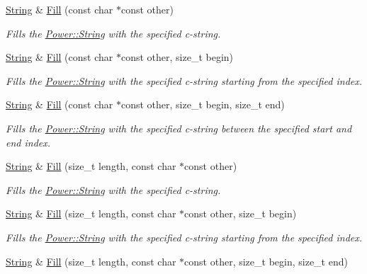 \begin{DoxyCompactItemize}
\hyperlink{class_power_1_1_string}{String} \& \hyperlink{class_power_1_1_string_a8adb368321b42b3399836b4f1b6410e2}{Fill} (const char $\ast$const other)
\begin{DoxyCompactList}\small\item\em Fills the \hyperlink{class_power_1_1_string}{Power\+::\+String} with the specified c-\/string. \end{DoxyCompactList}\item 
\hyperlink{class_power_1_1_string}{String} \& \hyperlink{class_power_1_1_string_a8bbc67bacb2a655a92bd259a5541117d}{Fill} (const char $\ast$const other, size\+\_\+t begin)
\begin{DoxyCompactList}\small\item\em Fills the \hyperlink{class_power_1_1_string}{Power\+::\+String} with the specified c-\/string starting from the specified index. \end{DoxyCompactList}\item 
\hyperlink{class_power_1_1_string}{String} \& \hyperlink{class_power_1_1_string_a886afa62973aceb383e0560c3b6043f7}{Fill} (const char $\ast$const other, size\+\_\+t begin, size\+\_\+t end)
\begin{DoxyCompactList}\small\item\em Fills the \hyperlink{class_power_1_1_string}{Power\+::\+String} with the specified c-\/string between the specified start and end index. \end{DoxyCompactList}\item 
\hyperlink{class_power_1_1_string}{String} \& \hyperlink{class_power_1_1_string_a1f5d92e3f7c6d80bdcc6575c77689218}{Fill} (size\+\_\+t length, const char $\ast$const other)
\begin{DoxyCompactList}\small\item\em Fills the \hyperlink{class_power_1_1_string}{Power\+::\+String} with the specified c-\/string. \end{DoxyCompactList}\item 
\hyperlink{class_power_1_1_string}{String} \& \hyperlink{class_power_1_1_string_a8ed1d578da79962ec7c44419ae4df353}{Fill} (size\+\_\+t length, const char $\ast$const other, size\+\_\+t begin)
\begin{DoxyCompactList}\small\item\em Fills the \hyperlink{class_power_1_1_string}{Power\+::\+String} with the specified c-\/string starting from the specified index. \end{DoxyCompactList}\item 
\hyperlink{class_power_1_1_string}{String} \& \hyperlink{class_power_1_1_string_a0b32e7b8c1fde08ea22eab48a57badd8}{Fill} (size\+\_\+t length, const char $\ast$const other, size\+\_\+t begin, size\+\_\+t end)

\end{DoxyCompactItemize}
